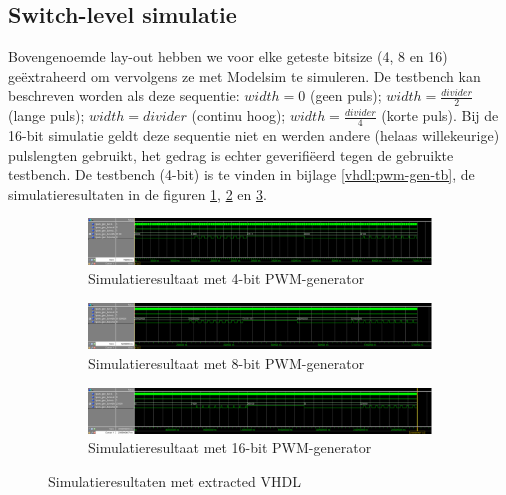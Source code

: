 \documentclass{article}
\begin{document}
\subsection{Switch-level simulatie}
\label{ssec:pwm-impl-switch}
Bovengenoemde lay-out hebben we voor elke geteste bitsize (4, 8 en 16) geëxtraheerd om vervolgens ze met Modelsim te simuleren. De testbench kan beschreven worden als deze sequentie: $width = 0$ (geen puls); $width = \frac{divider}{2}$ (lange puls); $width = divider$ (continu hoog); $width = \frac{divider}{4}$ (korte puls). Bij de 16-bit simulatie geldt deze sequentie niet en werden andere (helaas willekeurige) pulslengten gebruikt, het gedrag is echter geverifiëerd tegen de gebruikte testbench.
De testbench (4-bit) is te vinden in bijlage \ref{vhdl:pwm-gen-tb}, de simulatieresultaten in de figuren \ref{sfig:pwm-sim-4bit}, \ref{sfig:pwm-sim-8bit} en \ref{sfig:pwm-sim-16bit}.

\begin{figure}[H]
	\centering
	\begin{subfigure}{\textwidth}
		\includegraphics[width=\textwidth]{resource/pwm_gen_sim_4bit.png}
		\caption{Simulatieresultaat met 4-bit PWM-generator}
		\label{sfig:pwm-sim-4bit}
	\end{subfigure}
	\newline
	\begin{subfigure}{\textwidth}
		\includegraphics[width=\textwidth]{resource/pwm_gen_sim_8bit.png}
		\caption{Simulatieresultaat met 8-bit PWM-generator}
		\label{sfig:pwm-sim-8bit}
	\end{subfigure}
	\newline
	\begin{subfigure}{\textwidth}
		\includegraphics[width=\textwidth]{resource/pwm_gen_sim_16bit.png}
		\caption{Simulatieresultaat met 16-bit PWM-generator}
		\label{sfig:pwm-sim-16bit}
	\end{subfigure}
	\caption{Simulatieresultaten met extracted VHDL}
	\label{fig:pwm-sim}
\end{figure}
\end{document}
